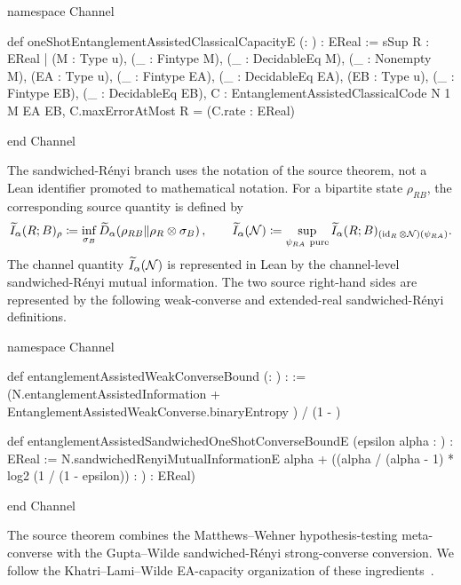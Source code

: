 \documentclass[10pt,a4paper]{article}
\begin{document}
\begin{qitleancode}[title={Extended-real one-shot EA capacity}]
namespace Channel

def oneShotEntanglementAssistedClassicalCapacityE (\epsilon : \mathbbR) : EReal :=
  sSup {R : EReal |
    \exists (M : Type u), \exists (_ : Fintype M),
      \exists (_ : DecidableEq M), \exists (_ : Nonempty M),
        \exists (EA : Type u), \exists (_ : Fintype EA), \exists (_ : DecidableEq EA),
          \exists (EB : Type u), \exists (_ : Fintype EB), \exists (_ : DecidableEq EB),
            \exists C : EntanglementAssistedClassicalCode N 1 M EA EB,
              C.maxErrorAtMost \epsilon \wedge R = (C.rate : EReal)}

end Channel
\end{qitleancode}
	
The sandwiched-R\'enyi branch uses the notation of the source theorem,
not a Lean identifier promoted to mathematical notation.  For a bipartite
state $\rho_{RB}$, the corresponding source quantity is defined by
\begin{equation}
    \widetilde I_{\alpha}(R;B)_{\rho}
    \coloneqq
    \inf_{\sigma_B}
    \widetilde D_{\alpha}
    \!\left(\rho_{RB}\middle\|\rho_R\otimes\sigma_B\right),
    \qquad
    \widetilde I_{\alpha}({\cal N})
    \coloneqq
    \sup_{\psi_{RA}\ {\rm pure}}
    \widetilde I_{\alpha}(R;B)_
    {(\operatorname{id}_{R}\otimes{\cal N})(\psi_{RA})}.
\end{equation}
The channel quantity $\widetilde I_{\alpha}({\cal N})$ is represented in
Lean by the channel-level sandwiched-R\'enyi mutual information.  The two
source right-hand sides are represented by the following weak-converse and
extended-real sandwiched-R\'enyi definitions.
	
\begin{qitleancode}[title={One-shot converse bounds}]
namespace Channel

def entanglementAssistedWeakConverseBound (\epsilon : \mathbbR) : \mathbbR :=
  (N.entanglementAssistedInformation +
      EntanglementAssistedWeakConverse.binaryEntropy \epsilon) / (1 - \epsilon)

def entanglementAssistedSandwichedOneShotConverseBoundE
    (epsilon alpha : \mathbbR) : EReal :=
  N.sandwichedRenyiMutualInformationE alpha +
    ((alpha / (alpha - 1) * log2 (1 / (1 - epsilon)) : \mathbbR) : EReal)

end Channel
\end{qitleancode}
	
	The source theorem combines the Matthews--Wehner hypothesis-testing
	meta-converse with the Gupta--Wilde sandwiched-R\'enyi strong-converse
	conversion.  We follow the Khatri--Lami--Wilde EA-capacity organization of these
	ingredients~\cite{MatthewsWehner2012,GuptaWilde2013,KhatriLamiWilde2025Principles}.
	
\end{document}

